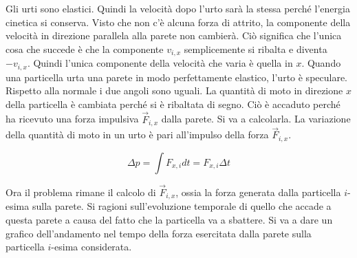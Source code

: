 \FloatBarrier
Gli urti sono elastici. Quindi la velocità dopo l'urto sarà la stessa perché l'energia cinetica si conserva. Visto che non c'è alcuna forza di attrito, la componente della velocità in direzione parallela alla parete non cambierà. Ciò significa che l'unica cosa che succede è che la componente $v_{i,x}$ semplicemente si ribalta e diventa $-v_{i,x}$. Quindi l'unica componente della velocità che varia è quella in $x$. Quando una particella urta una parete in modo perfettamente elastico, l'urto è speculare. Rispetto alla normale i due angoli sono uguali. La quantità di moto in direzione $x$ della particella è cambiata perché si è ribaltata di segno. Ciò è accaduto perché ha ricevuto una forza impulsiva $\vec{F}_{i,x}$ dalla parete. Si va a calcolarla. La variazione della quantità di moto in un urto è pari all'impulso della forza $\vec{F}_{i,x}$.

\[
	\Delta p = \int F_{x,i} dt = F_{x,i}\Delta t
\]

Ora il problema rimane il calcolo di $\vec{F}_{i,x}$, ossia la forza generata dalla particella $i$-esima sulla parete. Si ragioni sull'evoluzione temporale di quello che accade a questa parete a causa del fatto che la particella va a sbattere.
Si va a dare un grafico dell'andamento nel tempo della forza esercitata dalla parete sulla particella $i$-esima considerata.


